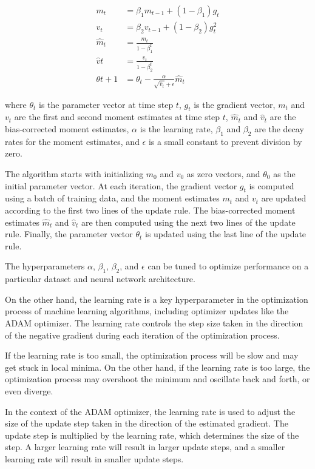 \begin{equation}
\begin{split}
	m_t &= \beta_1 m_{t-1} + (1-\beta_1) g_t \\
	v_t &= \beta_2 v_{t-1} + (1-\beta_2) g_t^2 \\
	\hat{m}_t &= \frac{m_t}{1-\beta_1^t} \\
	\hat{v}t &= \frac{v_t}{1-\beta_2^t} \\
	\theta{t+1} &= \theta_t - \frac{\alpha}{\sqrt{\hat{v}_t}+\epsilon} \hat{m}_t
\end{split}
\end{equation}

where $\theta_t$ is the parameter vector at time step $t$, $g_t$ is the gradient vector, $m_t$ and $v_t$ are the first and second moment estimates at time step $t$, $\hat{m}_t$ and $\hat{v}_t$ are the bias-corrected moment estimates, $\alpha$ is the learning rate, $\beta_1$ and $\beta_2$ are the decay rates for the moment estimates, and $\epsilon$ is a small constant to prevent division by zero.

The algorithm starts with initializing $m_0$ and $v_0$ as zero vectors, and $\theta_0$ as the initial parameter vector. At each iteration, the gradient vector $g_t$ is computed using a batch of training data, and the moment estimates $m_t$ and $v_t$ are updated according to the first two lines of the update rule. The bias-corrected moment estimates $\hat{m}_t$ and $\hat{v}_t$ are then computed using the next two lines of the update rule. Finally, the parameter vector $\theta_t$ is updated using the last line of the update rule.

The hyperparameters $\alpha$, $\beta_1$, $\beta_2$, and $\epsilon$ can be tuned to optimize performance on a particular dataset and neural network architecture.

On the other hand, the learning rate is a key hyperparameter in the optimization process of machine learning algorithms, including optimizer updates like the \ac{ADAM} optimizer. The learning rate controls the step size taken in the direction of the negative gradient during each iteration of the optimization process.

If the learning rate is too small, the optimization process will be slow and may get stuck in local minima. On the other hand, if the learning rate is too large, the optimization process may overshoot the minimum and oscillate back and forth, or even diverge.

In the context of the \ac{ADAM} optimizer, the learning rate is used to adjust the size of the update step taken in the direction of the estimated gradient. The update step is multiplied by the learning rate, which determines the size of the step. A larger learning rate will result in larger update steps, and a smaller learning rate will result in smaller update steps.

